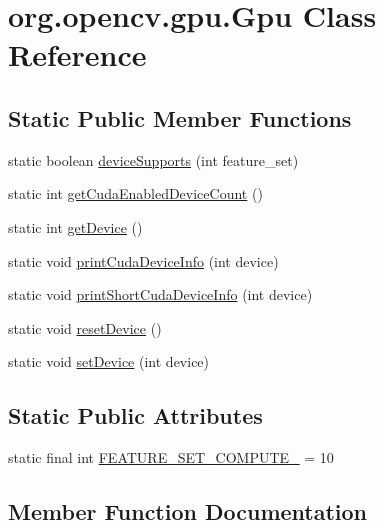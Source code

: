 \hypertarget{classorg_1_1opencv_1_1gpu_1_1_gpu}{}\section{org.\+opencv.\+gpu.\+Gpu Class Reference}
\label{classorg_1_1opencv_1_1gpu_1_1_gpu}
\subsection*{Static Public Member Functions}
\begin{DoxyCompactItemize}
\item 
static boolean \mbox{\hyperlink{classorg_1_1opencv_1_1gpu_1_1_gpu_a868497ac04295e9a53493557770b7e8f}{device\+Supports}} (int feature\+\_\+set)
\item 
static int \mbox{\hyperlink{classorg_1_1opencv_1_1gpu_1_1_gpu_a1bcbdfa693c5a6fd996833489bb7217d}{get\+Cuda\+Enabled\+Device\+Count}} ()
\item 
static int \mbox{\hyperlink{classorg_1_1opencv_1_1gpu_1_1_gpu_af3af8765ce3b12eb9bd40acaf7625be2}{get\+Device}} ()
\item 
static void \mbox{\hyperlink{classorg_1_1opencv_1_1gpu_1_1_gpu_aa14868afd8a9864671e09ed065178388}{print\+Cuda\+Device\+Info}} (int device)
\item 
static void \mbox{\hyperlink{classorg_1_1opencv_1_1gpu_1_1_gpu_ac9fdb11c4fe29579efe872c03944b228}{print\+Short\+Cuda\+Device\+Info}} (int device)
\item 
static void \mbox{\hyperlink{classorg_1_1opencv_1_1gpu_1_1_gpu_a002053fc8e3fb433e724a52ac3d10c93}{reset\+Device}} ()
\item 
static void \mbox{\hyperlink{classorg_1_1opencv_1_1gpu_1_1_gpu_a8810025585a9699886aead66fde53216}{set\+Device}} (int device)
\end{DoxyCompactItemize}
\subsection*{Static Public Attributes}
\begin{DoxyCompactItemize}
\item 
static final int \mbox{\hyperlink{classorg_1_1opencv_1_1gpu_1_1_gpu_aebadfdeb5cbcac4ec5d5cf12025a6784}{F\+E\+A\+T\+U\+R\+E\+\_\+\+S\+E\+T\+\_\+\+C\+O\+M\+P\+U\+T\+E\+\_}} = 10
\end{DoxyCompactItemize}


\subsection{Member Function Documentation}
\mbox{\label{classorg_1_1opencv_1_1gpu_1_1_gpu_a868497ac04295e9a53493557770b7e8f}} 
